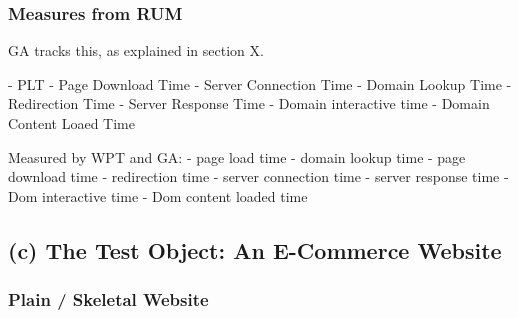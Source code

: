 \subsubsection{Measures from RUM}

GA tracks this, as explained in section X.

- PLT
- Page Download Time
- Server Connection Time
- Domain Lookup Time
- Redirection Time
- Server Response Time
- Domain interactive time
- Domain Content Loaed Time



Measured by WPT and GA:
- page load time
- domain lookup time
- page download time
- redirection time
- server connection time
- server response time
- Dom interactive time
- Dom content loaded time





\subsection{(c) The Test Object: An E-Commerce Website}









\subsubsection{Plain / Skeletal Website}


